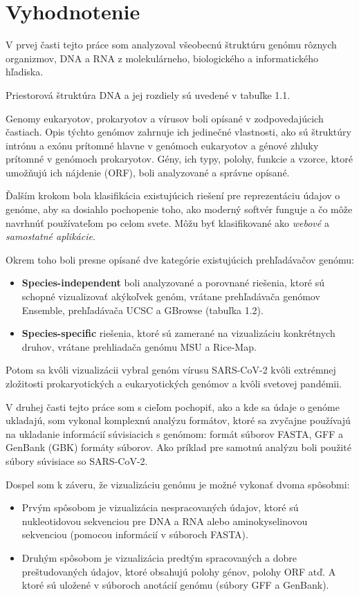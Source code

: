 
\chapter{Vyhodnotenie}

V prvej časti tejto práce som analyzoval všeobecnú štruktúru genómu rôznych organizmov, DNA a RNA z molekulárneho, biologického a informatického hľadiska.

Priestorová štruktúra DNA a jej rozdiely sú uvedené v tabuľke 1.1.

Genomy eukaryotov, prokaryotov a vírusov boli opísané v zodpovedajúcich častiach.
Opis týchto genómov zahrnuje ich jedinečné vlastnosti, ako sú štruktúry intrónu a exónu prítomné hlavne v genómoch eukaryotov a génové zhluky prítomné v genómoch prokaryotov.
Gény, ich typy, polohy, funkcie a vzorce, ktoré umožňujú ich nájdenie (ORF), boli analyzované a správne opísané.

Ďalším krokom bola klasifikácia existujúcich riešení pre reprezentáciu údajov o genóme, aby sa dosiahlo pochopenie toho, ako moderný softvér funguje a čo môže navrhnúť používateľom po celom svete.
Môžu byť klasifikované ako \textit{webové} a \textit{samostatné aplikácie}.

Okrem toho boli presne opísané dve kategórie existujúcich prehľadávačov genómu:
\begin{itemize}
    \item \textbf{Species-independent} boli analyzované a porovnané riešenia, ktoré sú schopné vizualizovať akýkoľvek genóm, vrátane prehľadávača genómov Ensemble, prehľadávača UCSC a GBrowse (tabuľka 1.2).
    \item \textbf{Species-specific} riešenia, ktoré sú zamerané na vizualizáciu konkrétnych druhov, vrátane prehliadača genómu MSU a Rice-Map.
\end{itemize}

Potom sa kvôli vizualizácii vybral genóm vírusu SARS-CoV-2 kvôli extrémnej zložitosti prokaryotických a eukaryotických genómov a kvôli svetovej pandémii.

V druhej časti tejto práce som s cieľom pochopiť, ako a kde sa údaje o genóme ukladajú, som vykonal komplexnú analýzu formátov, ktoré sa zvyčajne používajú na ukladanie informácií súvisiacich s genómom: formát súborov FASTA, GFF a GenBank (GBK) formáty súborov.
Ako príklad pre samotnú analýzu boli použité súbory súvisiace so SARS-CoV-2.

Dospel som k záveru, že vizualizáciu genómu je možné vykonať dvoma spôsobmi:
\begin{itemize}
    \item Prvým spôsobom je vizualizácia nespracovaných údajov, ktoré sú nukleotidovou sekvenciou pre DNA a RNA alebo aminokyselinovou sekvenciou (pomocou informácií v súboroch FASTA).
    \item Druhým spôsobom je vizualizácia predtým spracovaných a dobre preštudovaných údajov, ktoré obsahujú polohy génov, polohy ORF atď. A ktoré sú uložené v súboroch anotácií genómu (súbory GFF a GenBank).
\end{itemize}

